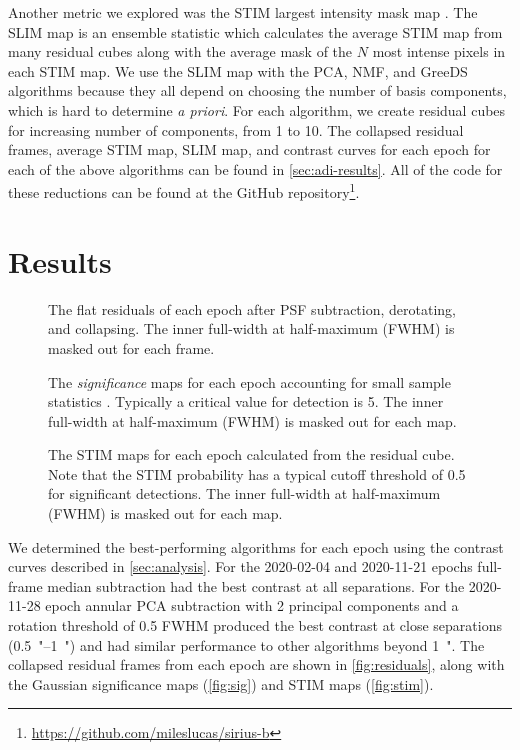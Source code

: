 \documentclass[twocolumn]{aastex631}
\begin{document}
Another metric we explored was the STIM largest intensity mask map \citep[SLIM map;][]{pairet_signal_2020}. The SLIM map is an ensemble statistic which calculates the average STIM map from many residual cubes along with the average mask of the $N$ most intense pixels in each STIM map. We use the SLIM map with the PCA, NMF, and GreeDS algorithms because they all depend on choosing the number of basis components, which is hard to determine \textit{a priori}. For each algorithm, we create residual cubes for increasing number of components, from 1 to 10. The collapsed residual frames, average STIM map, SLIM map, and contrast curves for each epoch for each of the above algorithms can be found in \autoref{sec:adi-results}. All of the code for these reductions can be found at the GitHub repository\footnote{\href{https://github.com/mileslucas/sirius-b}{https://github.com/mileslucas/sirius-b}}.

\section{Results} \label{sec:results}

\begin{figure*}
    \centering
    \caption{The flat residuals of each epoch after PSF subtraction, derotating, and collapsing. The inner full-width at half-maximum (FWHM) is masked out for each frame.}
    \label{fig:residuals}
\end{figure*}

\begin{figure*}
    \centering
    \caption{The \textit{significance} maps for each epoch accounting for small sample statistics \citep{mawet_fundamental_2014}. Typically a critical value for detection is 5. The inner full-width at half-maximum (FWHM) is masked out for each map.}
    \label{fig:sig}
\end{figure*}

\begin{figure*}
    \centering
    \caption{The STIM maps for each epoch calculated from the residual cube. Note that the STIM probability has a typical cutoff threshold of 0.5 for significant detections. The inner full-width at half-maximum (FWHM) is masked out for each map.}
    \label{fig:stim}
\end{figure*}

We determined the best-performing algorithms for each epoch using the contrast curves described in \autoref{sec:analysis}. For the 2020-02-04 and 2020-11-21 epochs full-frame median subtraction had the best contrast at all separations. For the 2020-11-28 epoch annular PCA subtraction with 2 principal components and a rotation threshold of 0.5 FWHM produced the best contrast at close separations (\qtyrange{0.5}{1}{"}) and had similar performance to other algorithms beyond \qty{1}{"}. The collapsed residual frames from each epoch are shown in \autoref{fig:residuals}, along with the Gaussian significance maps (\autoref{fig:sig}) and STIM maps (\autoref{fig:stim}).
\end{document}
